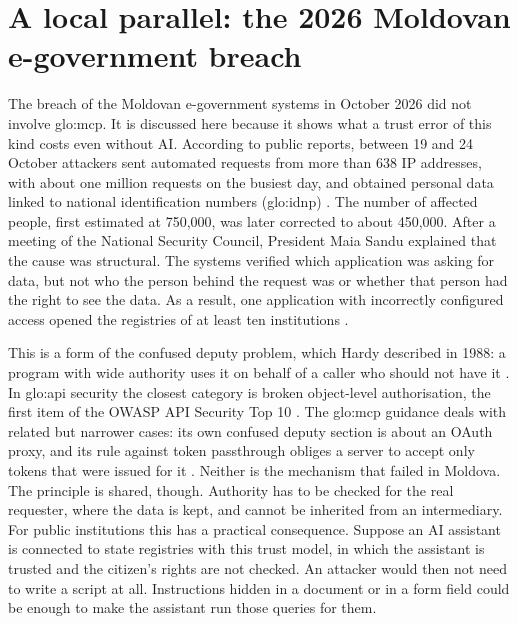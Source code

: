 \section{A local parallel: the 2026 Moldovan e-government breach}

\par The breach of the Moldovan e-government systems in October 2026 did not involve \acrshort{glo:mcp}. It is discussed here because it shows what a trust error of this kind costs even without AI. According to public reports, between 19 and 24 October attackers sent automated requests from more than 638 IP addresses, with about one million requests on the busiest day, and obtained personal data linked to national identification numbers (\acrshort{glo:idnp}) \cite{biometric2026moldova, tv82026, cotidianul2026}. The number of affected people, first estimated at 750,000, was later corrected to about 450,000. After a meeting of the National Security Council, President Maia Sandu explained that the cause was structural. The systems verified which application was asking for data, but not who the person behind the request was or whether that person had the right to see the data. As a result, one application with incorrectly configured access opened the registries of at least ten institutions \cite{tv82026}.

\par This is a form of the confused deputy problem, which Hardy described in 1988: a program with wide authority uses it on behalf of a caller who should not have it \cite{hardy1988}. In \acrshort{glo:api} security the closest category is broken object-level authorisation, the first item of the OWASP API Security Top 10 \cite{owaspapi2023}. The \acrshort{glo:mcp} guidance deals with related but narrower cases: its own confused deputy section is about an OAuth proxy, and its rule against token passthrough obliges a server to accept only tokens that were issued for it \cite{mcpsecbp}. Neither is the mechanism that failed in Moldova. The principle is shared, though. Authority has to be checked for the real requester, where the data is kept, and cannot be inherited from an intermediary. For public institutions this has a practical consequence. Suppose an AI assistant is connected to state registries with this trust model, in which the assistant is trusted and the citizen's rights are not checked. An attacker would then not need to write a script at all. Instructions hidden in a document or in a form field could be enough to make the assistant run those queries for them.

